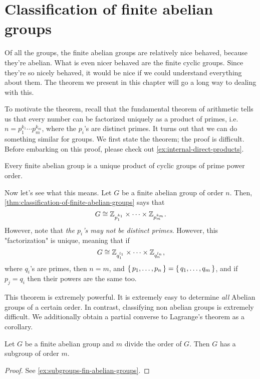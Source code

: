 \documentclass[./main.tex]{subfiles}
\begin{document}
\section{Classification of finite abelian groups}
Of all the groups, the finite abelian groups are relatively nice behaved,
because they're abelian. What is even nicer behaved are the finite cyclic
groups. Since they're so nicely behaved, it would be nice if we could understand
everything about them. The theorem we present in this chapter will go a long way
to dealing with this.

To motivate the theorem, recall that the fundamental theorem of arithmetic tells
us that every number can be factorized uniquely as a product of primes, i.e. $n
= p_1^{k_1} \cdots p_m^{k_m}$, where the $p_i$'s are distinct primes. It turns
out that we can do something similar for groups. We first state the theorem; the
proof is difficult. Before embarking on this proof, please check out
\cref{ex:internal-direct-products}. 

\begin{theorem}
\label{thm:classification-of-finite-abelian-groups}
    Every finite abelian group is a unique product of cyclic groups of prime
    power order. 
\end{theorem}
Now let's see what this means. Let $G$ be a finite abelian group of order $n$.
Then, \cref{thm:classification-of-finite-abelian-groups} says that 
\[
    G \cong \mathbb{Z}_{p_1^{k_1}} \times \cdots \times \mathbb{Z}_{p_m^{k_m}}.
\]
However, note that \emph{the $p_i$'s may not be distinct primes}. However, this
"factorization" is unique, meaning that if 
\[
    G \cong \mathbb{Z}_{q_1^{l_1}} \times \cdots \times \mathbb{Z}_{q_n^{l_n}},
\]
where $q_i$'s are primes, then $n = m$, and $\set{p_1, \dots, p_n} = \set{q_1,
\dots, q_m}$, and if $p_j = q_i$ then their powers are the same too.


This theorem is extremely powerful. It is extremely easy to determine \emph{all}
Abelian groups of a certain order. In contrast, classifying non abelian groups
is extremely difficult. We additionally obtain a partial converse to Lagrange's
theorem as a corollary.
\begin{corollary}
\label{cor:subgroups-fin-abelian-groups}
    Let $G$ be a finite abelian group and $m$ divide the order of $G$. Then $G$
    has a subgroup of order $m$.
\end{corollary}
\begin{proof}
    See \cref{ex:subgroups-fin-abelian-groups}.
\end{proof}
\end{document}

